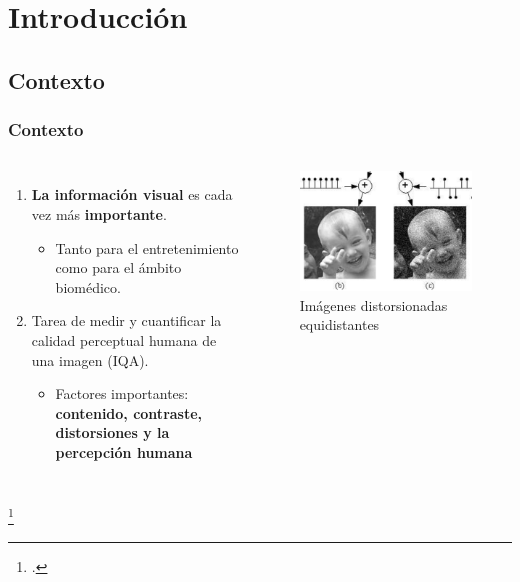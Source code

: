 \section[Introducción]{Introducción}
\subsection[Contexto]{Contexto}
\begin{frame}
    \frametitle{Contexto}
    \begin{columns}
    \begin{enumerate}
      \item \textbf{La información visual} es cada vez más \textbf{importante}.
        \begin{itemize}
          \item Tanto para el entretenimiento como para el ámbito biomédico.
        \end{itemize}
      \item{Tarea de medir y cuantificar} la calidad perceptual humana de una imagen (IQA). 
        \begin{itemize}
          \item Factores importantes: \textbf{contenido, contraste, distorsiones y la percepción humana}
        \end{itemize}
    \end{enumerate}
    \begin{figure}
      \begin{center}
        \includegraphics[width=\textwidth]{imagenes/chapter1/failure_minkowski_metricBIG}
      \end{center}
      \caption{Imágenes distorsionadas equidistantes\footnotemark}
    \end{figure}
  \end{columns}
  \vspace{-.2cm}
  \footcitetext{MinkowskiFailure}
\end{frame}

